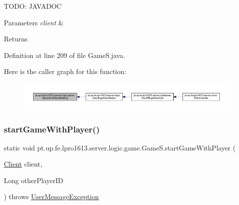 T\+O\+DO\+: J\+A\+V\+A\+D\+OC 
\begin{DoxyParams}{Parameters}
{\em client} & \\
\hline
\end{DoxyParams}
\begin{DoxyReturn}{Returns}

\end{DoxyReturn}


Definition at line 209 of file Game\+S.\+java.

Here is the caller graph for this function\+:
\nopagebreak
\begin{figure}[H]
\begin{center}
\leavevmode
\includegraphics[width=350pt]{classpt_1_1up_1_1fe_1_1lpro1613_1_1server_1_1logic_1_1game_1_1_game_s_a31685e0c50b5cda9628aab4467ef564f_icgraph}
\end{center}
\end{figure}
\hypertarget{classpt_1_1up_1_1fe_1_1lpro1613_1_1server_1_1logic_1_1game_1_1_game_s_ae8d6ec6320a1f06d60719c91dbfbe21c}{}\label{classpt_1_1up_1_1fe_1_1lpro1613_1_1server_1_1logic_1_1game_1_1_game_s_ae8d6ec6320a1f06d60719c91dbfbe21c} 
\subsubsection{\texorpdfstring{start\+Game\+With\+Player()}{startGameWithPlayer()}}
{\footnotesize\ttfamily static void pt.\+up.\+fe.\+lpro1613.\+server.\+logic.\+game.\+Game\+S.\+start\+Game\+With\+Player (\begin{DoxyParamCaption}\item[{\hyperlink{classpt_1_1up_1_1fe_1_1lpro1613_1_1server_1_1conn_1_1_client}{Client}}]{client,  }\item[{Long}]{other\+Player\+ID }\end{DoxyParamCaption}) throws \hyperlink{classpt_1_1up_1_1fe_1_1lpro1613_1_1sharedlib_1_1exceptions_1_1_user_message_exception}{User\+Message\+Exception}\hspace{0.3cm}{\ttfamily [static]}}

